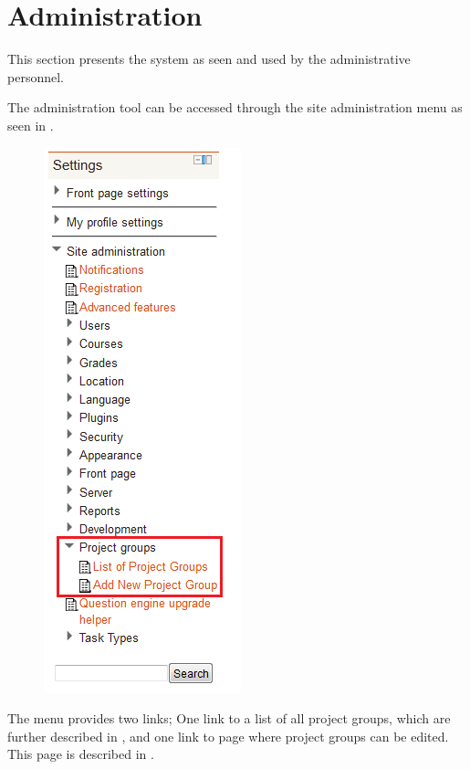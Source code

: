 
\section{Administration}
\label{sec:adminPrensentation}
This section presents the system as seen and used by the administrative personnel.

The administration tool can be accessed through the site administration menu as seen in .

\begin{figure}[htb]
	\centering
		\includegraphics[scale=0.6]{images/admin-navigation.png}
	\label{fig:navigation}
\end{figure}
The menu provides two links; One link to a list of all project groups, which are further described in , and one link to page where project groups can be edited. 
This page is described in .

